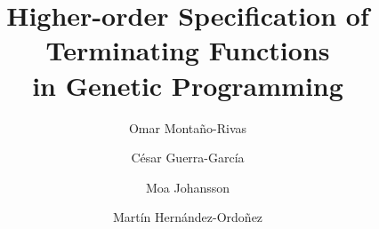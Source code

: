 \newtheorem{defn}{Definition}[section]
\newtheorem{thm}{Theorem}[section]
\newcommand{\crossover}[3]{\left.\sideset{_{#1}^{#3}}{_{#2}^{}}{\scriptstyle\bigotimes}\right.}
\newcommand{\Crossover}[4]{\left.\sideset{_{#1}^{#3}}{_{#2}^{#4}}\bigotimes\right.}
\newcommand{\mutation}[2]{\left.\sideset{^{#2}}{_{#1}}{\scriptstyle\bigodot}\right.}
\newcommand{\mutationtmp}[1]{\left.\sideset{}{_{#1}}{\scriptstyle\bigodot}\right.}
\newcommand{\Mutation}[3]{\left.\sideset{^{#2}}{_{#1}^{#3}}\bigodot\right.}
\newcommand{\Mutationtmp}[1]{\left.\sideset{}{_{#1}}\bigodot\right.}
\newcommand{\subterm}[2]{\left. #1 \right|_{#2}}
\newcommand{\replace}[3]{#1 [#2]_{#3}}
\newcommand{\normal}[2]{\left. #1 \right\downarrow_{#2}}
\newcommand{\normali}[1]{\left. #1 \right\downarrow}
\newcommand{\etaexpanded}[1]{\left. #1 \right\uparrow^{\eta}}
\newcommand{\etalong}[1]{\left. #1 \right\updownarrow^{\eta}_{\beta}}
\newcommand{\lang}[1]{\(\bf{#1}\)}
\newcommand{\pbox}[1]{\psframebox{#1}}
\newcommand{\nothing}[1]{#1}
\newcommand{\changed}[1]{#1}
\newcommand{\changeda}[1]{\cbstart#1 \cbend}








\title{Higher-order Specification of Terminating Functions\\in Genetic Programming}


\author{Omar Monta\~no-Rivas \and C\'esar Guerra-Garc\'ia \and Moa Johansson \and Mart\'in Hern\'andez-Ordo\~nez}%

